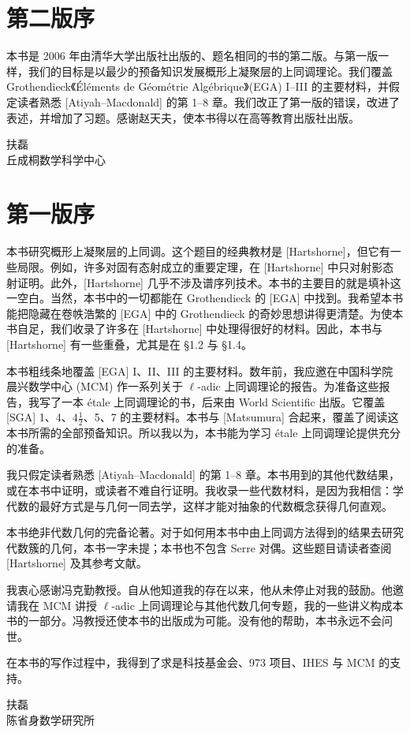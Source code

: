 \section*{第二版序}

本书是 2006 年由清华大学出版社出版的、题名相同的书的第二版。与第一版一样，我们的目标是以最少的预备知识发展概形上凝聚层的上同调理论。我们覆盖 Grothendieck《Éléments de Géométrie Algébrique》(EGA) I–III 的主要材料，并假定读者熟悉 [Atiyah–Macdonald] 的第 1–8 章。我们改正了第一版的错误，改进了表述，并增加了习题。感谢赵天夫，使本书得以在高等教育出版社出版。

\vspace{1.5em}
\begin{flushright}
扶磊\\
丘成桐数学科学中心
\end{flushright}

\clearpage
\section*{第一版序}

本书研究概形上凝聚层的上同调。这个题目的经典教材是 [Hartshorne]，但它有一些局限。例如，许多对固有态射成立的重要定理，在 [Hartshorne] 中只对射影态射证明。此外，[Hartshorne] 几乎不涉及谱序列技术。本书的主要目的就是填补这一空白。当然，本书中的一切都能在 Grothendieck 的 [EGA] 中找到。我希望本书能把隐藏在卷帙浩繁的 [EGA] 中的 Grothendieck 的奇妙思想讲得更清楚。为使本书自足，我们收录了许多在 [Hartshorne] 中处理得很好的材料。因此，本书与 [Hartshorne] 有一些重叠，尤其是在 \S1.2 与 \S1.4。

本书粗线条地覆盖 [EGA] I、II、III 的主要材料。数年前，我应邀在中国科学院晨兴数学中心 (MCM) 作一系列关于 $\ell$-adic 上同调理论的报告。为准备这些报告，我写了一本 étale 上同调理论的书，后来由 World Scientific 出版。它覆盖 [SGA] 1、4、$4\frac{1}{2}$、5、7 的主要材料。本书与 [Matsumura] 合起来，覆盖了阅读这本书所需的全部预备知识。所以我以为，本书能为学习 étale 上同调理论提供充分的准备。

我只假定读者熟悉 [Atiyah–Macdonald] 的第 1–8 章。本书用到的其他代数结果，或在本书中证明，或读者不难自行证明。我收录一些代数材料，是因为我相信：学代数的最好方式是与几何一同去学，这样才能对抽象的代数概念获得几何直观。

本书绝非代数几何的完备论著。对于如何用本书中由上同调方法得到的结果去研究代数簇的几何，本书一字未提；本书也不包含 Serre 对偶。这些题目请读者查阅 [Hartshorne] 及其参考文献。

我衷心感谢冯克勤教授。自从他知道我的存在以来，他从未停止对我的鼓励。他邀请我在 MCM 讲授 $\ell$-adic 上同调理论与其他代数几何专题，我的一些讲义构成本书的一部分。冯教授还使本书的出版成为可能。没有他的帮助，本书永远不会问世。

在本书的写作过程中，我得到了求是科技基金会、973 项目、IHES 与 MCM 的支持。

\vspace{1.5em}
\begin{flushright}
扶磊\\
陈省身数学研究所
\end{flushright}
